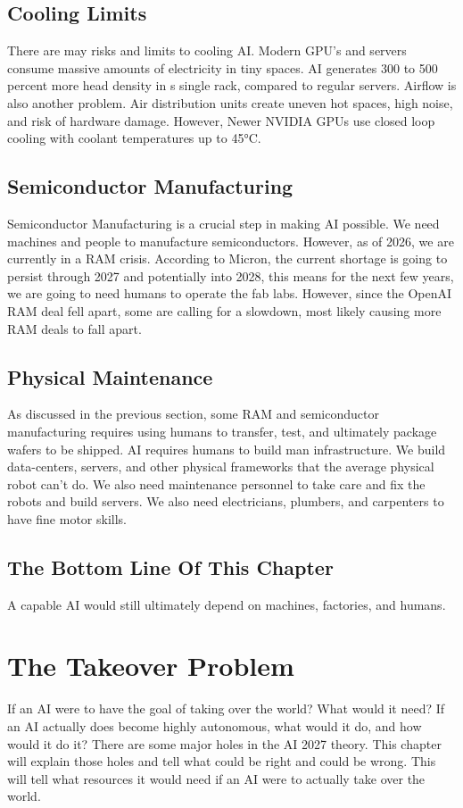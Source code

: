 \documentclass{report}
\begin{document}
	\section{Cooling Limits}
	There are may risks and limits to cooling AI. Modern GPU's and servers consume massive amounts of electricity in tiny spaces. AI generates 300 to 500 percent more head density in s single rack, compared to regular servers. Airflow is also another problem. Air distribution units create uneven hot spaces, high noise, and risk of hardware damage. However, Newer NVIDIA GPUs use closed loop cooling with coolant temperatures up to 45°C.
	
	\section{Semiconductor Manufacturing}
	Semiconductor Manufacturing is a crucial step in making AI possible. We need machines and people to manufacture semiconductors. However, as of 2026, we are currently in a RAM crisis. According to Micron, the current shortage is going to persist through 2027 and potentially into 2028, this means for the next few years, we are going to need humans to operate the fab labs. However, since the OpenAI RAM deal fell apart, some are calling for a slowdown, most likely causing more RAM deals to fall apart.
	
	\section{Physical Maintenance}
	As discussed in the previous section, some RAM and semiconductor manufacturing requires using humans to transfer, test, and ultimately package wafers to be shipped. AI requires humans to build man infrastructure. We build data-centers, servers, and other physical frameworks that the average physical robot can't do. We also need maintenance personnel to take care and fix the robots and build servers. We also need electricians, plumbers, and carpenters to have fine motor skills.
	
	\section{The Bottom Line Of This Chapter}
	A capable AI would still ultimately depend on machines, factories, and humans. 
	
	\chapter{The Takeover Problem}
	If an AI were to have the goal of taking over the world? What would it need? If an AI actually does become highly autonomous, what would it do, and how would it do it? There are some major holes in the AI 2027 theory. This chapter will explain those holes and tell what could be right and could be wrong. This will tell what resources it would need if an AI were to actually take over the world.
	
\end{document}
